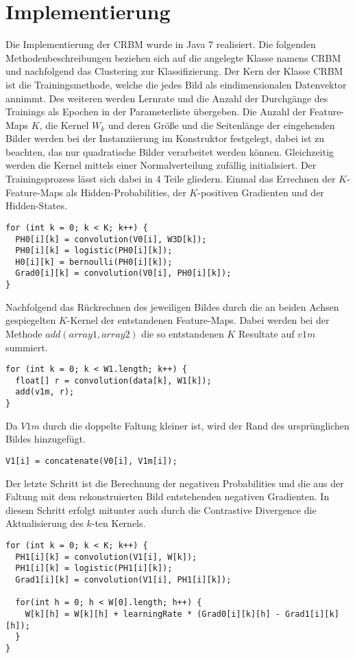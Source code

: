 \section{Implementierung}\label{implementation}
Die Implementierung der CRBM wurde in Java 7 realisiert.
Die folgenden Methodenbeschreibungen beziehen sich auf die angelegte Klasse namens CRBM und nachfolgend das Clustering zur Klassifizierung.
Der Kern der Klasse CRBM ist die Trainingsmethode, welche die jedes Bild als eindimensionalen Datenvektor annimmt. Des weiteren werden Lernrate und die Anzahl der Durchgänge des Trainings als Epochen in der Parameterliste übergeben.
Die Anzahl der Feature-Maps $K$, die Kernel $W_k$ und deren Größe und die Seitenlänge der eingehenden Bilder werden bei der Instanziierung im Konstruktor festgelegt, dabei ist zu beachten, das nur quadratische Bilder verarbeitet werden können. Gleichzeitig werden die Kernel mittels einer Normalverteilung zufällig initialisiert.
Der Trainingsprozess lässt sich dabei in 4 Teile gliedern. Einmal das Errechnen der $K$-Feature-Maps als Hidden-Probabilities, der $K$-positiven Gradienten und der Hidden-States.
\begin{lstlisting}
for (int k = 0; k < K; k++) {
  PH0[i][k] = convolution(V0[i], W3D[k]);
  PH0[i][k] = logistic(PH0[i][k]);
  H0[i][k] = bernoulli(PH0[i][k]);
  Grad0[i][k] = convolution(V0[i], PH0[i][k]);
}
\end{lstlisting}
Nachfolgend das Rückrechnen des jeweiligen Bildes durch die an beiden Achsen gespiegelten $K$-Kernel der entstandenen Feature-Maps. Dabei werden bei der Methode $add(array1, array2)$ die so entstandenen $K$ Resultate auf $v1m$ summiert.
\begin{lstlisting}
for (int k = 0; k < W1.length; k++) {
  float[] r = convolution(data[k], W1[k]);
  add(v1m, r);
}
\end{lstlisting}
Da $V1m$ durch die doppelte Faltung kleiner ist, wird der Rand des ursprünglichen Bildes hinzugefügt.
\begin{lstlisting}
V1[i] = concatenate(V0[i], V1m[i]);
\end{lstlisting}
Der letzte Schritt ist die Berechnung der negativen Probabilities und die aus der Faltung mit dem rekonstruierten Bild entstehenden negativen Gradienten. In diesem Schritt erfolgt mitunter auch durch die Contrastive Divergence die Aktualisierung des $k$-ten Kernels.
\begin{lstlisting}
for (int k = 0; k < K; k++) {
  PH1[i][k] = convolution(V1[i], W[k]);
  PH1[i][k] = logistic(PH1[i][k]);
  Grad1[i][k] = convolution(V1[i], PH1[i][k]);

  for(int h = 0; h < W[0].length; h++) {
    W[k][h] = W[k][h] + learningRate * (Grad0[i][k][h] - Grad1[i][k][h]);
  }
}
\end{lstlisting}